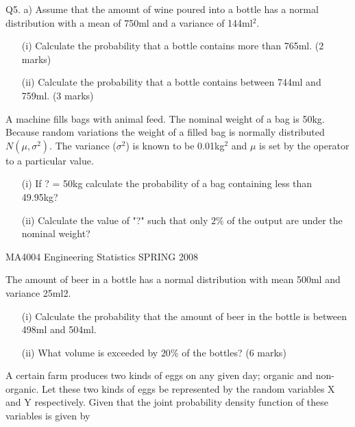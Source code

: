 \documentclass[12pt]{report}
\begin{document}
{%


Q5. a) Assume that the amount of wine poured into a bottle has a normal distribution with a mean of 750ml and a variance of 144ml$^2$.

\begin{itemize}

\item[(i)]  Calculate the probability that a bottle contains more than 765ml. (2 marks)
\item[(ii)]    Calculate the probability that a bottle contains between 744ml and 759ml. (3 marks)
\end{itemize}
A machine fills bags with animal feed. The nominal weight of a bag is 50kg.
Because random variations the weight of a filled bag is normally distributed
$N(\mu, \sigma^2)$. The variance ($\sigma^2$) is known to be 0.01kg$^2$ and $\mu$ is set by the
operator to a particular value.

\begin{itemize}
	\item[(i)] If ? = 50kg calculate the probability of a bag containing less than
49.95kg?
	\item[(ii)] Calculate the value of "?" such that only $2\%$ of the output are under the
nominal weight?
\end{itemize}

MA4004     Engineering Statistics    SPRING 2008


The amount of beer in a bottle has a normal distribution with mean 500ml and variance 25ml2.
\begin{itemize}
\item[(i)]	Calculate the probability that the amount of beer in the bottle is between 498ml and 504ml.
\item[(ii)]	What volume is exceeded by $20\%$ of the bottles?
(6 marks)
\end{itemize}

	
	
	
	A certain farm produces two kinds of eggs on any given day; organic and non-organic. 
	Let these two kinds of eggs be represented by the random variables X and Y respectively. 
	Given that the joint probability density function of these variables is given by
	
}
\end{document}
